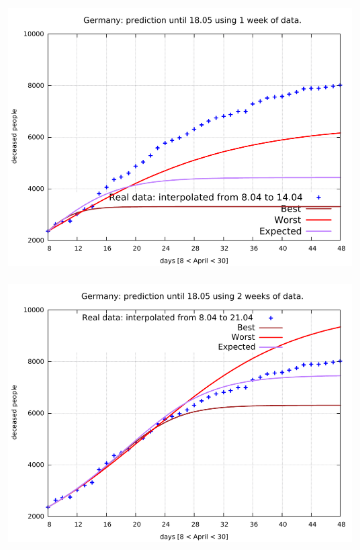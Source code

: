 \documentclass[8pt]{article}
\begin{document}
\begin{figure}[h!]
  \centering
  \begin{subfigure}[b]{0.45\linewidth}
  \includegraphics[width=\linewidth]{../simulations_v1/de/8-14/8-14.pdf}
  \end{subfigure}
  \begin{subfigure}[b]{0.45\linewidth}
    \includegraphics[width=\linewidth]{../simulations_v1/de/8-21/8-21.pdf}
  \end{subfigure}
  \begin{subfigure}[b]{0.45\linewidth}

\end{subfigure}
\end{figure}
\end{document}
